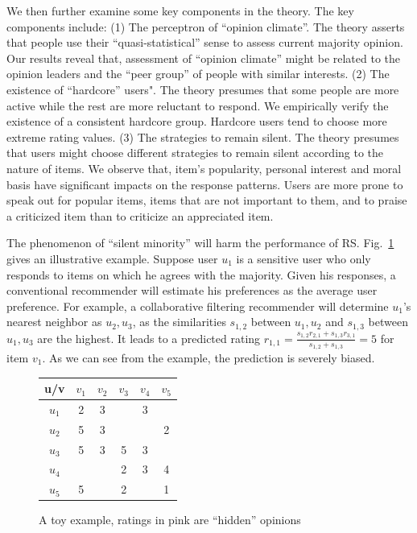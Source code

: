 \documentclass[sigconf]{acmart}
\begin{document}
We then further examine some key components in the theory. The key components include: (1) The perceptron of ``opinion climate''. The theory asserts that people use their ``quasi-statistical'' sense to assess current majority opinion. Our results reveal that, assessment of ``opinion climate'' might be related to the opinion leaders and the ``peer group'' of people with similar interests. (2) The existence of ``hardcore'' users". The theory presumes that some people are more active while the rest are more reluctant to respond. We empirically verify the existence of a consistent hardcore group. Hardcore users tend to choose more extreme rating values. (3) The strategies to remain silent. The theory presumes that users might choose different strategies to remain silent according to the nature of items. We observe that, item's popularity, personal interest and moral basis have significant impacts on the response patterns. Users are more prone to speak out for popular items, items that are not important to them, and to praise a criticized item than to criticize an appreciated item.


The phenomenon of ``silent minority'' will harm the performance of RS. Fig.~\ref{fig:example} gives an illustrative example. Suppose user $u_1$ is a sensitive user who only responds to items on which he agrees with the majority. Given his responses, a conventional recommender will estimate his preferences as the average user preference. For example, a collaborative filtering recommender will determine $u_1$'s nearest neighbor as $u_2,u_3$, as the similarities    $s_{1,2}$ between $u_1,u_2$ and $s_{1,3}$ between $u_1,u_3$ are the highest. It leads to a predicted rating $r_{1,1}=\frac{s_{1,2} r_{2,1}+s_{1,3} r_{3,1}}{s_{1,2}+s_{1,3} }=5$ for item $v_1$. As we can see from the example, the prediction is severely biased.

\begin{figure}
\centering
\tiny
\begin{tabular}{|c|c|c|c|c|c|}
\hline
u/v & $v_1$ & $v_2$ & $v_3$ & $v_4$ & $v_5$ \\\hline\hline
 $u_1$ & \color{pink}2 & 3 & & 3 &  \\\hline
 $u_2$ & 5 & 3 & &  &2 \\\hline
 $u_3$ & 5 & 3 &5 & 3 & \\\hline
 $u_4$ &  &  &2 & 3 & 4 \\\hline
 $u_5$ & 5 &  &2 &  &  1\\\hline
\end{tabular}
\caption{A toy example, ratings in pink are ``hidden'' opinions}\label{fig:example}
\end{figure}
\end{document}
